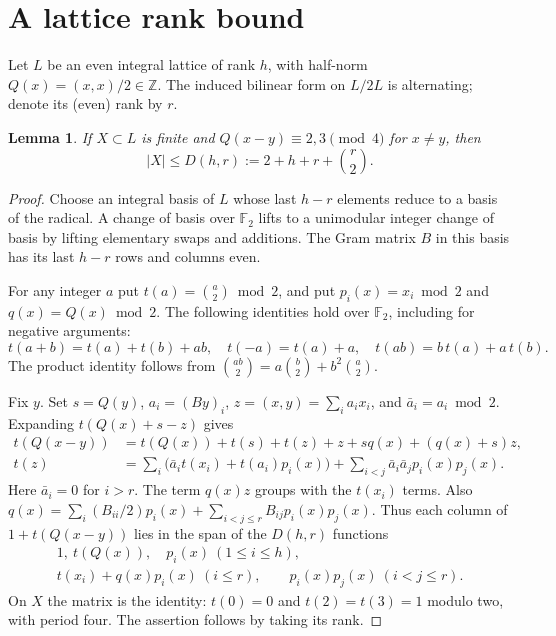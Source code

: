 \documentclass[11pt]{article}
\newtheorem{lemma}[theorem]{Lemma}
\newcommand{\F}{\mathbb F_2}
\newcommand{\ZZ}{\mathbb Z}
\begin{document}
\section{A lattice rank bound}\label{sec:rank}
Let $L$ be an even integral lattice of rank $h$, with half-norm $Q(x)=(x,x)/2\in\ZZ$. The induced bilinear form on $L/2L$ is alternating; denote its (even) rank by $r$.
\begin{lemma}\label{lem:rank}
If $X\subset L$ is finite and $Q(x-y)\equiv2,3\pmod4$ for $x\ne y$, then
\[
|X|\le D(h,r):=2+h+r+\binom r2 .
\]
\end{lemma}
\begin{proof}
Choose an integral basis of $L$ whose last $h-r$ elements reduce to a basis of the radical. A change of basis over $\F$ lifts to a unimodular integer change of basis by lifting elementary swaps and additions. The Gram matrix $B$ in this basis has its last $h-r$ rows and columns even.

For any integer $a$ put $t(a)=\binom a2\bmod2$, and put $p_i(x)=x_i\bmod2$ and $q(x)=Q(x)\bmod2$. The following identities hold over $\F$, including for negative arguments:
\[
t(a+b)=t(a)+t(b)+ab,\quad t(-a)=t(a)+a,\quad t(ab)=b\,t(a)+a\,t(b).
\]
The product identity follows from $\binom{ab}{2}=a\binom b2+b^2\binom a2$.

Fix $y$. Set $s=Q(y)$, $a_i=(By)_i$, $z=(x,y)=\sum_i a_i x_i$, and $\bar a_i=a_i\bmod 2$. Expanding $t(Q(x)+s-z)$ gives
\begin{align*}
t(Q(x-y))&=t(Q(x))+t(s)+t(z)+z+s q(x)+(q(x)+s)z,\\
t(z)&=\sum_i\bigl(\bar a_i t(x_i)+t(a_i)p_i(x)\bigr)
       +\sum_{i<j}\bar a_i\bar a_j p_i(x)p_j(x).
\end{align*}
Here $\bar a_i=0$ for $i>r$. The term $q(x)z$ groups with the $t(x_i)$ terms. Also $q(x)=\sum_i(B_{ii}/2)p_i(x)+\sum_{i<j\le r} B_{ij}p_i(x)p_j(x)$. Thus each column of $1+t(Q(x-y))$ lies in the span of the $D(h,r)$ functions
\begin{equation}\label{eq:features}
\begin{gathered}
1,\ t(Q(x)),\quad p_i(x)\ (1\le i\le h),\\
t(x_i)+q(x)p_i(x)\ (i\le r),\qquad p_i(x)p_j(x)\ (i<j\le r).
\end{gathered}
\end{equation}
On $X$ the matrix is the identity: $t(0)=0$ and $t(2)=t(3)=1$ modulo two, with period four. The assertion follows by taking its rank.
\end{proof}
\end{document}
